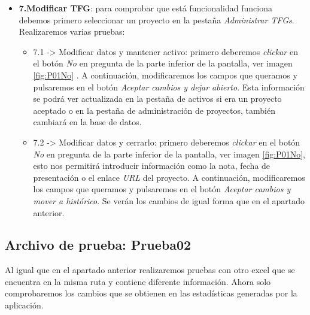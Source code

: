 \begin{itemize}
	
	\item \textbf{7.Modificar TFG}: para comprobar que está funcionalidad funciona debemos primero seleccionar un proyecto en la pestaña \emph{Administrar TFGs}. Realizaremos varias pruebas:
		\begin{itemize}
			\item 7.1 -> Modificar datos y mantener activo: primero deberemos \emph{clickar} en el botón \emph{No} en pregunta de la parte inferior de la pantalla, ver imagen \ref{fig:P01No} . A continuación, modificaremos los campos que queramos y pulsaremos en el botón \emph{Aceptar cambios y dejar abierto}. Esta información se podrá ver actualizada en la pestaña de activos si era un proyecto aceptado o en la pestaña de administración de proyectos, también cambiará en la base de datos.
			\item 7.2 -> Modificar datos y cerrarlo: primero deberemos \emph{clickar} en el botón \emph{No} en pregunta de la parte inferior de la pantalla, ver imagen \ref{fig:P01No}, esto nos permitirá introducir información como la nota, fecha de presentación o el enlace \emph{URL} del proyecto. A continuación, modificaremos los campos que queramos y pulsaremos en el botón \emph{Aceptar cambios y mover a histórico}. Se verán los cambios de igual forma que en el apartado anterior.			
		\end{itemize}
\end{itemize}


\subsection{Archivo de prueba: Prueba02}
Al igual que en el apartado anterior realizaremos pruebas con otro excel que se encuentra en la misma ruta y contiene diferente información. Ahora solo comprobaremos los cambios que se obtienen en las estadísticas generadas por la aplicación.

